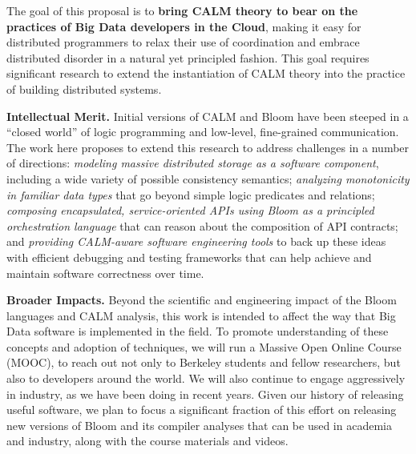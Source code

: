 The goal of this proposal is to \textbf{bring CALM theory to bear on the practices of Big Data developers in the Cloud}, making it easy for distributed programmers to relax their use of coordination and embrace distributed disorder in a natural yet principled fashion.  This goal requires significant research to extend the instantiation of CALM theory into the practice of building distributed systems.  


\vspace{6pt}
\noindent \textbf{Intellectual Merit.} Initial versions of CALM and Bloom have been steeped in a ``closed world'' of logic programming and low-level, fine-grained communication.  The work here proposes to extend this research to address challenges in a number of directions: \emph{modeling massive distributed storage as a software component}, including a wide variety of possible consistency semantics; \emph{analyzing monotonicity in familiar data types} that go beyond simple logic predicates and relations; \emph{composing encapsulated, service-oriented APIs using Bloom as a principled orchestration language} that can reason about the composition of API contracts; and \emph{providing CALM-aware software engineering tools} to back up these ideas with efficient debugging and testing frameworks that can help achieve and maintain software correctness over time.
 
\vspace{6pt}
\noindent \textbf{Broader Impacts.} Beyond the scientific and engineering impact of the Bloom languages and CALM analysis, this work is intended to affect the way that Big Data software is implemented in the field.  To promote understanding of these concepts and adoption of techniques, we will run a Massive Open Online Course (MOOC), to reach out not only to Berkeley students and fellow researchers, but also to developers around the world. We will also continue to engage aggressively in industry, as we have been doing in recent years.  Given our history of releasing useful software, we plan to focus a significant fraction of this effort on releasing new versions of Bloom and its compiler analyses that can be used in academia and industry, along with the course materials and videos.

